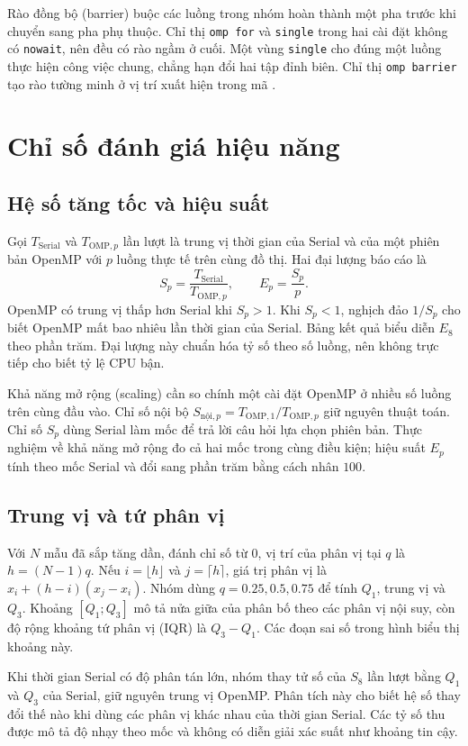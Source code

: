Rào đồng bộ (barrier) buộc các luồng trong nhóm hoàn thành một pha trước khi chuyển sang pha phụ thuộc. Chỉ thị \texttt{omp for} và \texttt{single} trong hai cài đặt không có \texttt{nowait}, nên đều có rào ngầm ở cuối. Một vùng \texttt{single} cho đúng một luồng thực hiện công việc chung, chẳng hạn đổi hai tập đỉnh biên. Chỉ thị \texttt{omp barrier} tạo rào tường minh ở vị trí xuất hiện trong mã \cite{openmp52}.

\section{Chỉ số đánh giá hiệu năng}
\label{sec:metrics}
\subsection{Hệ số tăng tốc và hiệu suất}
Gọi $T_{\mathrm{Serial}}$ và $T_{\mathrm{OMP},p}$ lần lượt là trung vị thời gian của Serial và của một phiên bản OpenMP với $p$ luồng thực tế trên cùng đồ thị. Hai đại lượng báo cáo là
\[
 S_p=\frac{T_{\mathrm{Serial}}}{T_{\mathrm{OMP},p}},
 \qquad E_p=\frac{S_p}{p}.
\]
OpenMP có trung vị thấp hơn Serial khi $S_p>1$. Khi $S_p<1$, nghịch đảo $1/S_p$ cho biết OpenMP mất bao nhiêu lần thời gian của Serial. Bảng kết quả biểu diễn $E_8$ theo phần trăm. Đại lượng này chuẩn hóa tỷ số theo số luồng, nên không trực tiếp cho biết tỷ lệ CPU bận.

Khả năng mở rộng (scaling) cần so chính một cài đặt OpenMP ở nhiều số luồng trên cùng đầu vào. Chỉ số nội bộ $S_{\text{nội},p}=T_{\mathrm{OMP},1}/T_{\mathrm{OMP},p}$ giữ nguyên thuật toán. Chỉ số $S_p$ dùng Serial làm mốc để trả lời câu hỏi lựa chọn phiên bản. Thực nghiệm về khả năng mở rộng đo cả hai mốc trong cùng điều kiện; hiệu suất $E_p$ tính theo mốc Serial và đổi sang phần trăm bằng cách nhân $100$.

\subsection{Trung vị và tứ phân vị}
Với $N$ mẫu đã sắp tăng dần, đánh chỉ số từ $0$, vị trí của phân vị tại $q$ là $h=(N-1)q$. Nếu $i=\lfloor h\rfloor$ và $j=\lceil h\rceil$, giá trị phân vị là $x_i+(h-i)(x_j-x_i)$. Nhóm dùng $q=\num{0.25},\num{0.5},\num{0.75}$ để tính $Q_1$, trung vị và $Q_3$. Khoảng $[Q_1;Q_3]$ mô tả nửa giữa của phân bố theo các phân vị nội suy, còn độ rộng khoảng tứ phân vị (IQR) là $Q_3-Q_1$. Các đoạn sai số trong hình biểu thị khoảng này.

Khi thời gian Serial có độ phân tán lớn, nhóm thay tử số của $S_8$ lần lượt bằng $Q_1$ và $Q_3$ của Serial, giữ nguyên trung vị OpenMP. Phân tích này cho biết hệ số thay đổi thế nào khi dùng các phân vị khác nhau của thời gian Serial. Các tỷ số thu được mô tả độ nhạy theo mốc và không có diễn giải xác suất như khoảng tin cậy.

